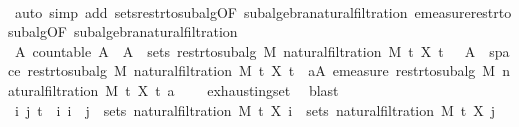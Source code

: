 \begin{isabellebody}
\ \ \ \ \isamarkupfalse%
\ {\isacharparenleft}{\kern0pt}auto\ simp\ add{\isacharcolon}{\kern0pt}\ sets{\isacharunderscore}{\kern0pt}restr{\isacharunderscore}{\kern0pt}to{\isacharunderscore}{\kern0pt}subalg{\isacharbrackleft}{\kern0pt}OF\ subalgebra{\isacharunderscore}{\kern0pt}natural{\isacharunderscore}{\kern0pt}filtration{\isacharbrackright}{\kern0pt}\ emeasure{\isacharunderscore}{\kern0pt}restr{\isacharunderscore}{\kern0pt}to{\isacharunderscore}{\kern0pt}subalg{\isacharbrackleft}{\kern0pt}OF\ subalgebra{\isacharunderscore}{\kern0pt}natural{\isacharunderscore}{\kern0pt}filtration{\isacharbrackright}{\kern0pt}{\isacharparenright}{\kern0pt}\isanewline
\ \ \isamarkupfalse%
\ \isamarkupfalse%
\ {\isachardoublequoteopen}{\isasymexists}A{\isachardot}{\kern0pt}\ countable\ A\ {\isasymand}\ A\ {\isasymsubseteq}\ sets\ {\isacharparenleft}{\kern0pt}restr{\isacharunderscore}{\kern0pt}to{\isacharunderscore}{\kern0pt}subalg\ M\ {\isacharparenleft}{\kern0pt}natural{\isacharunderscore}{\kern0pt}filtration\ M\ t\ X\ t\ {\isasymand}\ {\isasymUnion}\ A\ {\isacharequal}{\kern0pt}\ space\ {\isacharparenleft}{\kern0pt}restr{\isacharunderscore}{\kern0pt}to{\isacharunderscore}{\kern0pt}subalg\ M\ {\isacharparenleft}{\kern0pt}natural{\isacharunderscore}{\kern0pt}filtration\ M\ t\ X\ t\ {\isasymand}\ {\isacharparenleft}{\kern0pt}{\isasymforall}a{\isasymin}A{\isachardot}{\kern0pt}\ emeasure\ {\isacharparenleft}{\kern0pt}restr{\isacharunderscore}{\kern0pt}to{\isacharunderscore}{\kern0pt}subalg\ M\ {\isacharparenleft}{\kern0pt}natural{\isacharunderscore}{\kern0pt}filtration\ M\ t\ X\ t\ a\ {\isasymnoteq}\ {\isasyminfinity}{\isacharparenright}{\kern0pt}{\isachardoublequoteclose}\ \isamarkupfalse%
\ exhausting{\isacharunderscore}{\kern0pt}set\ \isamarkupfalse%
\ blast\isanewline
\ \ \isamarkupfalse%
\ {\isachardoublequoteopen}{\isasymAnd}i\ j{\isachardot}{\kern0pt}\ {\isasymlbrakk}t\ {\isasymle}\ i{\isacharsemicolon}{\kern0pt}\ i\ {\isasymle}\ j{\isasymrbrakk}\ {\isasymLongrightarrow}\ sets\ {\isacharparenleft}{\kern0pt}natural{\isacharunderscore}{\kern0pt}filtration\ M\ t\ X\ i{\isacharparenright}{\kern0pt}\ {\isasymsubseteq}\ sets\ {\isacharparenleft}{\kern0pt}natural{\isacharunderscore}{\kern0pt}filtration\ M\ t\ X\ j{\isacharparenright}{\kern0pt}{\isachardoublequoteclose}\ \isamarkupfalse%

\end{isabellebody}
